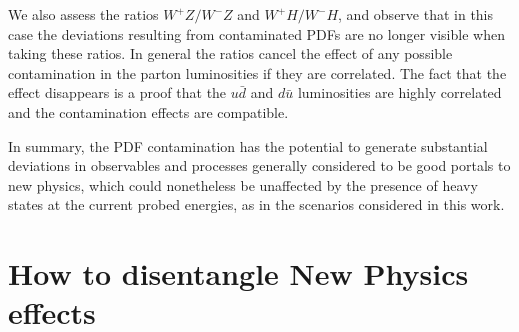 \documentclass[withindex,glossary]{cam-thesis}
\begin{document}
We also assess the ratios $W^+ Z / W^- Z$ and $W^+ H / W^- H$, and observe that in 
this case the deviations resulting from contaminated PDFs are 
no longer visible when taking these ratios. In general the ratios cancel the effect of 
any possible contamination in the parton luminosities if they are correlated. The fact 
that the effect disappears is a proof that the $u\bar{d}$ and $d\bar{u}$ luminosities are highly correlated and 
the contamination effects are compatible.
%
%
%
%
%
%
%
%
%

In summary, the PDF contamination has the potential to generate substantial deviations in observables and processes generally considered to be good portals to new physics, which could nonetheless be unaffected by the presence of heavy states at the current probed energies, as in the scenarios considered in this work.





\section{How to disentangle New Physics effects}
\label{sec:solution}
\end{document}
